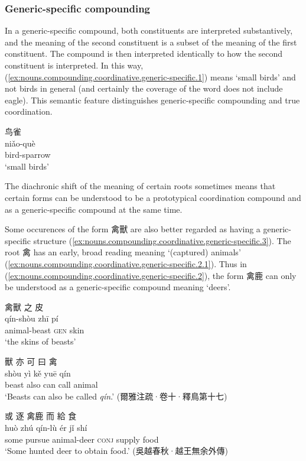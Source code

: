 \documentclass[UTF8, a4paper, oneside, scheme=plain, 12pt]{ctexrep}
\newcommand{\form}[1]{\emph{#1}}
\newcommand{\translate}[1]{`#1'}
\newcommand*{\category}[1]{\textsc{#1}}
\begin{document}
\subsubsection{Generic-specific compounding}

In a generic-specific compound, both constituents are interpreted substantively,
and the meaning of the second constituent is a subset of the meaning of the first constituent.
The compound is then interpreted identically to how the second constituent is interpreted.
In this way, (\ref{ex:nouns.compounding.coordinative.generic-specific.1})
means \translate{small birds} and not birds in general
(and certainly the coverage of the word does not include eagle).
This semantic feature distinguishes generic-specific compounding and true coordination.

\begin{exe}
    \ex\label{ex:nouns.compounding.coordinative.generic-specific.1}
    \glll 鸟雀 \\
    niǎo-què \\
    bird-sparrow \\
    \glt\translate{small birds}
\end{exe}

The diachronic shift of the meaning of certain roots sometimes means that 
certain forms can be understood to be a prototypical coordination compound 
and as a generic-specific compound at the same time.

Some occurences of the form 禽獸 are also better regarded as having a generic-specific structure (\ref{ex:nouns.compounding.coordinative.generic-specific.3}).
The root 禽 has an early, broad reading meaning \translate{(captured) animals} (\ref{ex:nouns.compounding.coordinative.generic-specific.2.1}).
Thus in (\ref{ex:nouns.compounding.coordinative.generic-specific.2}),
the form 禽鹿 can only be understood as a generic-specific compound meaning \translate{deers}.

\begin{exe}
    \ex\label{ex:nouns.compounding.coordinative.generic-specific.3}
    \glll 禽獸 之 皮 \\
    qín-shòu zhī pí \\
    animal-beast \category{gen} skin \\
    \glt\translate{the skins of beasts}

    \ex\label{ex:nouns.compounding.coordinative.generic-specific.2.1}
    \glll 獸 亦 可 曰 禽 \\
    shòu yì kě yuē qín \\
    beast also can call animal \\
    \glt\translate{Beasts can also be called \form{qín}.} \hfill (爾雅注疏·卷十·釋鳥第十七)

    \ex\label{ex:nouns.compounding.coordinative.generic-specific.2}
    \glll 或 逐 禽鹿 而 給 食 \\
    huò zhú qín-lù ér jǐ shí \\
    some pursue animal-deer \category{conj} supply food \\
    \glt\translate{Some hunted deer to obtain food.} \hfill (吳越春秋·越王無余外傳)
\end{exe}
\end{document}
